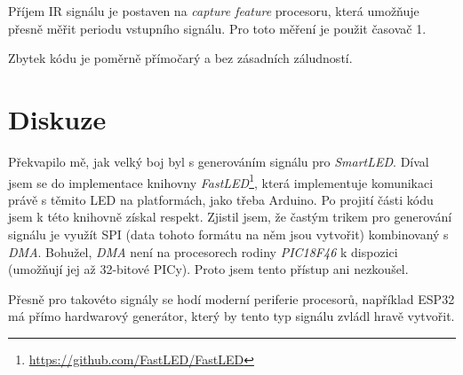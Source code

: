 \documentclass[12pt,a4paper]{article}
\begin{document}
Příjem IR signálu je postaven na \textit{capture feature} procesoru, která
umožňuje přesně měřit periodu vstupního signálu. Pro toto měření je použit
časovač 1.

Zbytek kódu je poměrně přímočarý a bez zásadních záludností.

\section{Diskuze}

Překvapilo mě, jak velký boj byl s generováním signálu pro \textit{SmartLED}.
Díval jsem se do implementace knihovny
\textit{FastLED}\footnote{\url{https://github.com/FastLED/FastLED}}, která
implementuje komunikaci právě s těmito LED na platformách, jako třeba Arduino.
Po projití části kódu jsem k této knihovně získal respekt. Zjistil jsem, že
častým trikem pro generování signálu je využít SPI (data tohoto formátu na něm
jsou vytvořit) kombinovaný s \textit{DMA}. Bohužel, \textit{DMA} není na
procesorech rodiny \textit{PIC18F46} k dispozici (umožňují jej až 32-bitové
PICy). Proto jsem tento přístup ani nezkoušel.

Přesně pro takovéto signály se hodí moderní periferie procesorů, například
ESP32 má přímo hardwarový generátor, který by tento typ signálu zvládl hravě
vytvořit.
\end{document}
